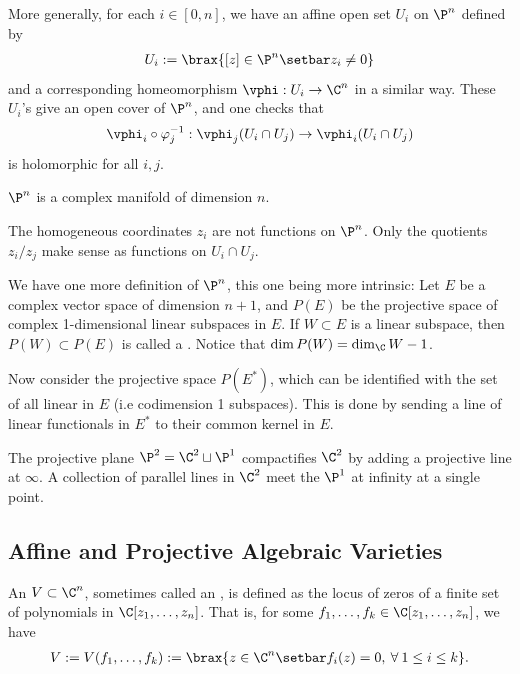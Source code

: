\documentclass[11pt]{report}
\begin{document}
More generally, for each $i \in [0,n]$, we have an affine open set $U_i$ on $\P^n$ defined by
\begin{align*}
U_i := \brax{ [z] \in \P^n \setbar z_i \ne 0 }
\end{align*}
and a corresponding homeomorphism $\vphi:U_i \to \C^n$ in a similar way. These $U_i$'s give an open cover of $\P^n$, and one checks that
\begin{align*}
\vphi _i \circ \varphi_j^{-1} :\vphi_j(U_i \cap U_j) \to \vphi_i (U_i \cap U_j)
\end{align*}
is holomorphic for all $i,j$.
\begin{prop}
$\P^n$ is a complex manifold of dimension $n$.
\end{prop}

\begin{notethm*}[Warning]
The homogeneous coordinates $z_i$ are not functions on $\P^n$. Only the quotients $z_i/z_j$ make sense as functions on $U_i \cap U_j$.
\end{notethm*}

We have one more definition of $\P^n$, this one being more intrinsic: Let $E$ be a complex vector space of dimension $n+1$, and $P(E)$ be the projective space of complex 1-dimensional linear subspaces in $E$. If $W \subset E$ is a linear subspace, then $P(W)\subset P(E)$ is called a . Notice that $\dim P(W)=\dim_\C W -1$.

Now consider the projective space $P(E^*)$, which can be identified with the set of all linear  in $E$ (i.e codimension 1 subspaces). This is done by sending a line of linear functionals in $E^*$ to their common kernel in $E$.


\begin{ex}
The projective plane $\P^2 = \C^2 \sqcup \P^1$ compactifies $\C^2$ by adding a projective line at $\infty$. A collection of parallel lines in $\C^2$ meet the $\P^1$ at infinity at a single point.

\end{ex}

\subsection{Affine and Projective Algebraic Varieties}

\begin{defn}
An  $V \subset \C^n$, sometimes called an , is defined as the locus of zeros of a finite set of polynomials in $\C[z_1,\dots,z_n]$. That is, for some $f_1,\dots,f_k \in \C[z_1,\dots,z_n]$, we have
\begin{align*}
V:= V(f_1,\dots,f_k):= \brax{z \in \C^n \setbar f_i(z)=0, \: \forall \: 1 \le i \le k}.
\end{align*}
\end{defn}
\end{document}
